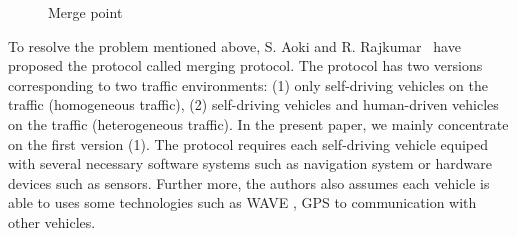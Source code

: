 \documentclass[10pt, conference, compsocconf]{IEEEtran}
\begin{document}
\begin{figure}[h]
\begin{center}
\end{center}
\caption{Merge point}
\label{mergePoint_fig}
\end{figure}

To resolve the problem mentioned above, 
S. Aoki and R. Rajkumar~\cite{10.1145/3055004.3055028} have proposed the protocol called merging protocol.
The protocol has two versions corresponding to two traffic environments: (1) only self-driving vehicles on the traffic (homogeneous traffic), 
(2) self-driving vehicles and human-driven vehicles on the traffic (heterogeneous traffic).
In the present paper, we mainly concentrate on the first version (1). 
The protocol requires each self-driving vehicle equiped with several necessary software systems such as navigation system or hardware devices such as sensors.
Further more, the authors also assumes each vehicle is able to uses some technologies such as WAVE \cite{4346439,5888501}, GPS to communication with other vehicles.
\end{document}
